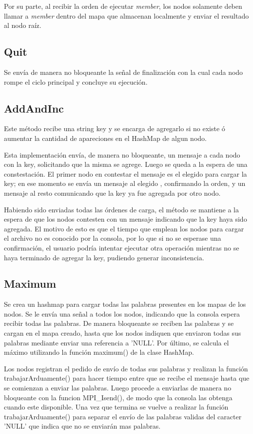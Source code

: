 Por su parte, al recibir la orden de ejecutar \textit{member}, los nodos
solamente deben llamar a \textit{member} dentro del mapa que almacenan
localmente y enviar el resultado al nodo raíz.

\subsection{Quit}

Se envía de manera no bloqueante la señal de finalización con la cual cada
nodo rompe el ciclo principal y concluye su ejecución.

\subsection{AddAndInc}

Este método recibe una string key y se encarga de agregarlo si no existe ó
aumentar la cantidad de apareciones en el HashMap de algun nodo.

Esta implementación envía, de manera no bloqueante, un mensaje a cada nodo con
la key, solicitando que la misma se agrege. Luego se queda a la espera de una
constestación.  El primer nodo en contestar el mensaje es el elegido para
cargar la key; en ese momento se envía un mensaje al elegido , confirmando
la orden, y un mensaje al resto comunicando que la key ya fue agregada por
otro  nodo.

Habiendo sido enviadas todas las órdenes de carga, el método se mantiene a la
espera de que los nodos contesten con un mensaje indicando que la key haya
sido agregada. El motivo de esto es que el tiempo que emplean los nodos para
cargar el archivo no es conocido por la consola, por lo que si no se esperase
una confirmación, el usuario podría intentar ejecutar otra operación mientras
no se haya terminado de agregar la key, pudiendo generar inconsistencia.

\subsection{Maximum}

Se crea un hashmap para cargar todas las palabras presentes en los mapas de 
los nodos. Se le envía una señal a todos los nodos, indicando que la consola espera  
recibir todas las palabras. De manera bloqueante se reciben las palabras
y se cargan en el mapa creado, hasta que los nodos indiquen que enviaron todas sus 
palabras mediante enviar una referencia a 'NULL'. Por último, se calcula el máximo 
utilizando la función maximum() de la clase HashMap.

Los nodos registran el pedido de envío de todas sus palabras y realizan la función 
trabajarArduamente() para hacer tiempo entre que se recibe el mensaje hasta que
se comienzan a enviar las palabras. Luego procede a enviarlas de manera no bloqueante 
con la funcion MPI_Isend(), de modo que la consola las obtenga cuando este disponible.
Una vez que termina se vuelve a realizar la función trabajarArduamente() para separar
el envío de las palabras validas del caracter 'NULL' que indica que no se enviarán mas palabras.
